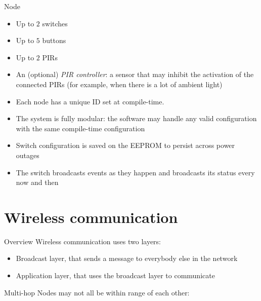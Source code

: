 \documentclass[italian]{beamer}
\newcommand{\no}{$\mathbin{\tikz [x=1.4ex,y=1.4ex,line width=.2ex, red] \draw (0,0) -- (1,1) (0,1) -- (1,0);}$}%
\begin{document}
\begin{frame}{Node}
    \begin{itemize}
        \item <1-> Up to $2$ switches
        \item <2-> Up to $5$ buttons
        \item <3-> Up to $2$ PIRs
        \item <4-> An (optional) \textit{PIR controller}: a sensor that may inhibit the activation
            of the connected PIRs (for example, when there is a lot of ambient light)
        \item <5-> Each node has a unique ID set at compile-time.
        \item <6-> The system is fully modular: the software may handle any valid configuration
            with the same compile-time configuration
        \item <7-> Switch configuration is saved on the EEPROM to persist across power outages
        \item <8-> The switch broadcasts events as they happen and broadcasts its status every
            now and then
    \end{itemize}
\end{frame}

\section{Wireless communication}
\begin{frame}{Overview}
    Wireless communication uses two layers:
    \begin{itemize}
        \item<1-> Broadcast layer, that sends a message to everybody else in the network
        \item<2-> Application layer, that uses the broadcast layer to communicate
    \end{itemize}
\end{frame}

\begin{frame}{Multi-hop}
    Nodes may not all be within range of each other:
    \vspace{1cm}
    \begin{center}
    \end{center}
\end{frame}
\end{document}

